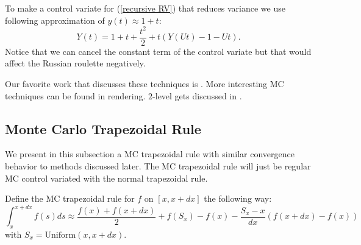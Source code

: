 \documentclass[a4paper,12pt]{article}
\begin{document}
\begin{example}
    To make a control variate for (\ref{recursive RV}) that reduces variance
    we use following approximation of $y(t) \approx 1+t$:
    \begin{equation}
        Y(t)= 1+t+\frac{t^{2}}{2} + t(Y(Ut)-1-Ut).
    \end{equation}
    Notice that we can cancel the constant term of the control variate
    but that would affect the Russian roulette negatively.
\end{example}

\vspace*{0.2cm}
\begin{pythonn}
\end{pythonn}

\begin{related}[MC modification]
    Our favorite work that discusses these techniques is \cite{veach_robust_nodate}.
    More interesting MC techniques  can be found in rendering.
    $2$-level gets discussed in \cite{giles_multilevel_2013}.
\end{related}

\subsection{Monte Carlo Trapezoidal Rule}
We present in this subsection a MC trapezoidal rule with similar convergence behavior to
methods discussed later. The MC trapezoidal rule will just be
regular MC control variated with the normal trapezoidal rule.

\begin{definition}
    Define the MC trapezoidal rule for $f$ on $[x,x+dx]$ the following
    way:
    \begin{equation}
        \int_{x}^{x+dx} f(s)ds \approx
        \frac{f(x)+f(x+dx)}{2} + f(S_{x})-f(x)-\frac{S_{x}-x}{dx} \left(f(x+dx)-f(x)\right)
    \end{equation}
    with $S_{x} = \text{Uniform}(x,x+dx)$.
\end{definition}
\end{document}
